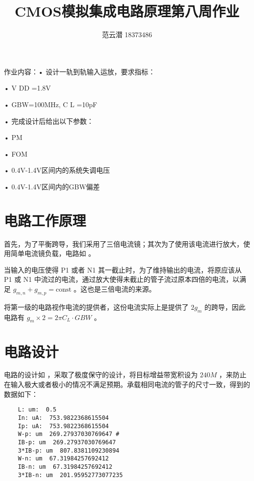 \documentclass[lang=cn,11pt,a4paper,cite=authoryear]{elegantpaper}
\title{CMOS模拟集成电路原理\quad 第八周作业}
\author{范云潜 18373486}
\institute{微电子学院 184111 班}
\date{\zhtoday}
\begin{document}
\maketitle

作业内容：• 设计一轨到轨输入运放，要求指标：

• V DD =1.8V

• GBW=100MHz, C L =10pF

• 完成设计后给出以下参数：

• PM

• FOM

• 0.4V-1.4V区间内的系统失调电压

• 0.4V-1.4V区间内的GBW偏差

\tableofcontents

\listoffigures


\section{电路工作原理}

首先，为了平衡跨导，我们采用了三倍电流镜；其次为了使用该电流进行放大，使用简单电流镜负载，电路如  。

当输入的电压使得 P1 或者 N1 其一截止时，为了维持输出的电流，将原应该从 P1 或 N1 中流过的电流，通过放大使得未截止的管子流过原本四倍的电流，以满足 \(g_{m,n} + g_{m,p} = \text{const}\) 。这也是三倍电流的来源。

将第一级的电路视作电流的提供者，这份电流实际上是提供了 \(2 g_m\) 的跨导，因此电路有 \(g_m \times 2 = 2 \pi C_L \cdot GBW \) 。


\section{电路设计}

电路的设计如  ，采取了极度保守的设计，将目标增益带宽积设为 \(240 M\) ，来防止在输入极大或者极小的情况不满足预期。承载相同电流的管子的尺寸一致，得到的数据如下： 

\begin{lstlisting}
    L: um:  0.5
    In: uA:  753.9822368615504 
    Ip: uA:  753.9822368615504
    W-p: um  269.27937030769647 # 
    IB-p: um  269.27937030769647
    3*IB-p: um  807.8381109230894
    W-n: um  67.31984257692412
    IB-n: um  67.31984257692412
    3*IB-n: um  201.95952773077235
\end{lstlisting}

\end{document}
